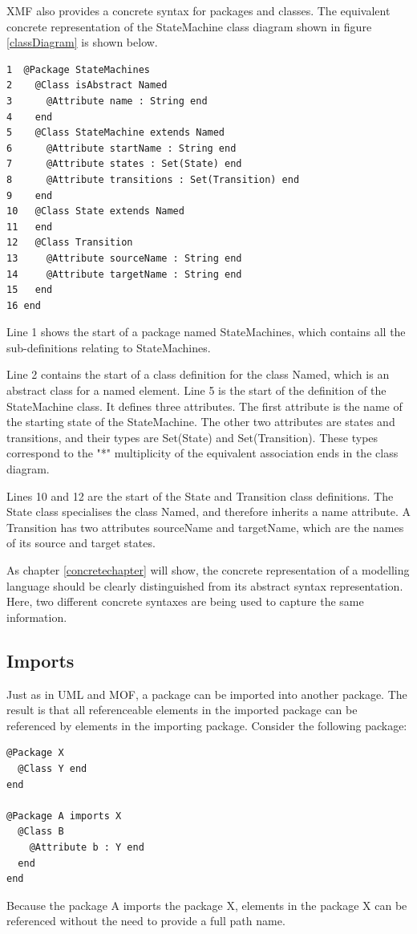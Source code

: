 XMF also provides a concrete syntax for packages and classes. The
equivalent concrete representation of the StateMachine class
diagram shown in figure \ref{classDiagram} is shown below.

\begin{lstlisting}
1  @Package StateMachines
2    @Class isAbstract Named
3      @Attribute name : String end
4    end
5    @Class StateMachine extends Named
6      @Attribute startName : String end
7      @Attribute states : Set(State) end
8      @Attribute transitions : Set(Transition) end
9    end
10   @Class State extends Named
11   end
12   @Class Transition
13     @Attribute sourceName : String end
14     @Attribute targetName : String end
15   end
16 end
\end{lstlisting}Line 1 shows the start of a package named StateMachines, which
contains all the sub-definitions relating to StateMachines.

Line 2 contains the start of a class definition for the class
Named,  which is an abstract class for a named element. Line 5 is
the start of the definition of the StateMachine class. It defines
three attributes. The first attribute is the name of the starting
state of the StateMachine. The other two attributes are states and
transitions, and their types are Set(State) and Set(Transition).
These types correspond to the "*" multiplicity of the equivalent
association ends in the class diagram.

Lines 10 and 12 are the start of the State and Transition class
definitions. The State class specialises the class Named, and
therefore inherits a name attribute. A Transition has two
attributes sourceName and targetName, which are the names of its
source and target states.

As chapter \ref{concretechapter} will show, the concrete
representation of a modelling language should be clearly
distinguished from its abstract syntax representation. Here, two
different concrete syntaxes are being used to capture the same
information.

\subsection{Imports}

Just as in UML and MOF, a package can be imported into another
package. The result is that all referenceable elements in the
imported package can be referenced by elements in the importing
package. Consider the following package:


\begin{lstlisting}
@Package X
  @Class Y end
end

@Package A imports X
  @Class B
    @Attribute b : Y end
  end
end
\end{lstlisting}
Because the package A imports the package X, elements in the
package X can be referenced without the need to provide a full
path name.

